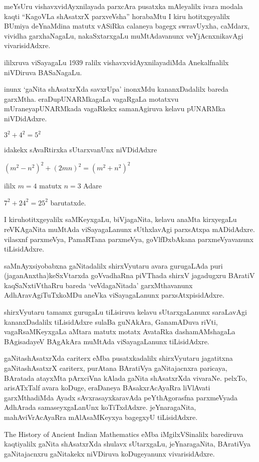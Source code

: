 meYsUru vishavxvidAyxnilayada parxcAra pusatxka mAleyalilx ivara modala kaqti ``KagoVLa shAsatxrX parxveVsha'' horabaMtu I kiru hotitxgeyalilx BUmiya deYnaM\-dina matutx vASiRka calaneya bagegx swravUyxha, caMdarx, vividha garxhaNagaLu, nakaSxtarxgaLu muMtAda\-vanunx veYjAcnxnikavAgi vivarisidAdxre.

ililxruva viSayagaLu {\rm 1939} ralilx vishavxvidAyxnilayadiMda Anekalfnalilx niVDiruva BASaNagaLu.

inunx `gaNita shAsatxrXda savxrUpa' inonxMdu kananxDadalilx bareda garxMtha. eraDu\break pUNARMkagaLa vagaRgaLa motatxvu mUraneyapUNARMkada vagaRkekx samanAgiruva kelavu pUNARMka niVDidAdxre.
\begin{center}
$3^2+4^2=5^2$

idakekx sAvaRtirxka sUtarxvanUnx niVDidAdxre

$(m^2-n^2)^2+(2mn)^2=(m^2+n^2)^2$

ililx $m=4$ matutx $n=3$ Adare

$7^2+24^{2}=25^2$ barutatxde.
\end{center}
I kiruhotitxgeyalilx saMKeyxgaLu, biVjagaNita, kelavu anaMta kirxyegaLu reVKAgaNita muMtAda viSayagaLanunx sUthxlavAgi parxsAtxpa mADidAdxre. vilasxnf parxmeVya, PamaRTana parxmeVya, goVlfDxbAkana parxmeVyavanunx tiLisidAdxre.

saMnAyxsiyobabxna gaNitadalilx shirxVyutaru avara gurugaLAda puri (jaganAnxtha)\break keSxVtarxda goVvadhaRna piVThada shirxV jagadugxru BAratiV kaqSaNxtiVthaRru bareda `veVdagaNitada' garxMthavanunx AdhAravAgiTuTxkoMDu aneVka viSayagaLanunx parxsAtxpisidAdxre.

shirxVyutaru tamamx gurugaLu tiLisiruva kelavu sUtarxgaLanunx saraLavAgi kananxDadalilx tiLisidAdxre sulaBa guNAkAra, GanamADuva riVti, vagaRsaMKeyxgaLa aMtara matutx motatx AvataRka dashamAMshagaLa BAgisadayeV BAgAkAra muMtAda viSayagaLanunx tiLisidAdxre.

gaNitashAsatxrXda cariterx eMba pusatxkadalilx shirxVyutaru jagatitxna gaNitashAsatxrX cariterx, purA\-tana BAratiVya gaNitajacnxra paricaya, BAratada atayxMta pArxciVna kAlada gaNita shAsatxrXda vivaraNe. pelxTo, arisATxTalf avara koDuge, eraDaneya BAsakxrAcAyaRra liVlAvati garxMthadiMda Ayadx sAvxrasayxkaravAda peYthAgorasfna parxmeVyada AdhArada samaseyx\-gaLanUnx koTiTxdAdxre. jeYnaragaNita, mahAviVrAcAyaRra mAlAsaMKeyxya bagegxyU tiLisidAdxre.

{\rm The History of Ancient Indian Mathematics} eMba iMgilxVSinalilx barediruva kaqtiyalilx gaNita shAsatxrXda shulavx sUtarxgaLu, jeYnaragaNita, BAratiVya gaNitajacnxru gaNitakekx niVDiruva koDugeyanunx vivarisidAdxre.


